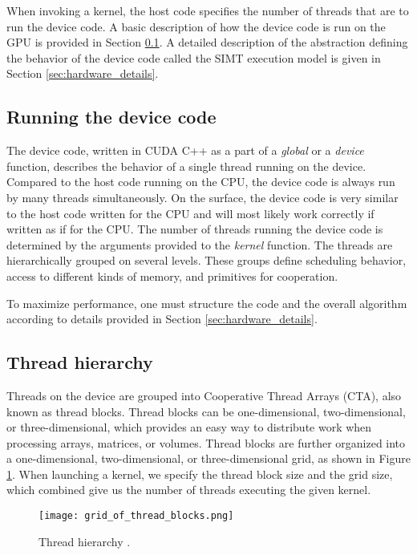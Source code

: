 When invoking a kernel, the host code specifies the number of threads that are to run the device code. A basic description of how the device code is run on the GPU is provided in Section \ref{sec:basic_device_code}. A detailed description of the abstraction defining the behavior of the device code called the SIMT execution model is given in Section \ref{sec:hardware_details}.

\subsection{Running the device code}
\label{sec:basic_device_code}

The device code, written in CUDA C++ as a part of a \textit{global} or a \textit{device} function, describes the behavior of a single thread running on the device. Compared to the host code running on the CPU, the device code is always run by many threads simultaneously. On the surface, the device code is very similar to the host code written for the CPU and will most likely work correctly if written as if for the CPU. The number of threads running the device code is determined by the arguments provided to the \textit{kernel} function. The threads are hierarchically grouped on several levels. These groups define scheduling behavior, access to different kinds of memory, and primitives for cooperation.

To maximize performance, one must structure the code and the overall algorithm according to details provided in Section \ref{sec:hardware_details}.



\subsection{Thread hierarchy}
\label{sec:thread_hierarchy}

Threads on the device are grouped into Cooperative Thread Arrays (CTA), also known as thread blocks. Thread blocks can be one-dimensional, two-dimensional, or three-dimensional, which provides an easy way to distribute work when processing arrays, matrices, or volumes. Thread blocks are further organized into a one-dimensional, two-dimensional, or three-dimensional grid, as shown in Figure \ref{fig:thread_hierarchy}. When launching a kernel, we specify the thread block size and the grid size, which combined give us the number of threads executing the given kernel.

\begin{figure}[ht]
	\centering
	\texttt{[image: grid\_of\_thread\_blocks.png]}
	\caption{Thread hierarchy \citep{site:cuda}.}
	\label{fig:thread_hierarchy}
\end{figure}

